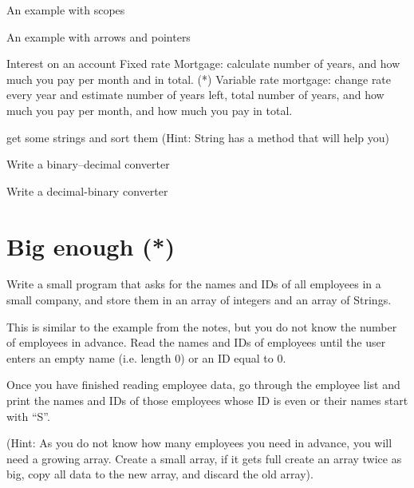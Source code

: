 
An example with scopes 

An example with arrows and pointers

Interest on an account
Fixed rate Mortgage: calculate number of years, and how much you pay
   per month and in total.
(*) Variable rate mortgage: change rate every year and estimate number
   of years left, total number of years, and how much you pay per
   month, and how much you pay in total.



get some strings and sort them (Hint: String has a method that will
help you)


Write a binary--decimal converter

Write a decimal-binary converter


\section{Big enough (*)}
\label{sec:big-enough}

Write a small program that asks for the names and IDs of all employees
in a small company, and store them in an array of integers and an
array of Strings. 

This is similar to the example from the notes, but you do not know the
number of employees in advance. Read the names and IDs of employees
until the user enters an empty name (i.e. length 0) or an ID equal to
0.

Once you have finished reading employee data, go through the employee
list and print the names and IDs of
those employees whose ID is even or their names start with ``S''. 

(Hint: As you do not know how many employees you need in advance, you
will need a growing array. Create a small array, if it gets full
create an array twice as big, copy all data to the new array, and
discard the old array).

